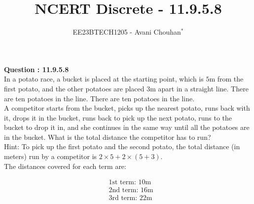 \documentclass[journal,12pt,twocolumn]{IEEEtran}
\theoremstyle{remark}
\begin{document}

\vspace{3cm}

\title{NCERT Discrete - 11.9.5.8}
\author{EE23BTECH1205 - Avani Chouhan$^{*}$%
}
\maketitle
\newpage
\bigskip

\renewcommand{\thefigure}{\theenumi}
\renewcommand{\thetable}{\theenumi}

\vspace{3cm}
\textbf{Question : 11.9.5.8} \\
In a potato race, a bucket is placed at the starting point, which is $5$m from the first potato, and the other potatoes are placed $3$m apart in a straight line. There are ten potatoes in the line. There are ten potatoes in the line.\\
A competitor starts from the bucket, picks up the nearest potato, runs back with it, drops it in the bucket, runs back to pick up the next potato, runs to the bucket to drop it in, and she continues in the same way until all the potatoes are in the bucket. What is the total distance the competitor has to run?\\

Hint: To pick up the first potato and the second potato, the total distance (in meters) run by a competitor is $2 \times 5 + 2 \times (5 + 3)$.\\

\solution
The distances covered for each term are:

\begin{align}
&\text{1st term: } 10\text{m} \\
&\text{2nd term: } 16\text{m} \\
&\text{3rd term: } 22\text{m} \\
\end{align}
\end{document}
